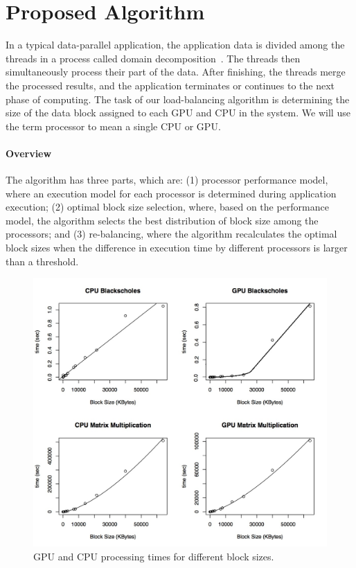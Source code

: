 \documentclass[journal]{IEEEtran}
\begin{document}

\section{Proposed Algorithm}

In a typical data-parallel application, the application data
is divided among the threads in a process called domain
decomposition~\cite{Gropp:1992uq}. The threads then simultaneously process their
part of the data. After finishing, the threads merge the processed results, and
the application terminates or continues to the next phase of computing. The task
of our load-balancing algorithm is determining the size of the data block
assigned to each GPU and CPU in the system. We will use the term processor to
mean a single CPU or GPU.

\vspace{0.2cm}
\paragraph*{Overview} The algorithm has three parts, which are: (1) processor 
performance model, where an execution model for each processor is determined
during application execution; (2) optimal block size selection, where, based on
the performance model, the algorithm selects the best distribution of block size
among the processors; and (3) re-balancing, where the algorithm recalculates the
optimal block sizes when the difference in execution time by different
processors is larger than a threshold.

\begin{figure}[!t]
	\centering
			\includegraphics[scale=0.45]{CPUVersusGPULinear2.jpg} 				
	\caption{GPU and CPU processing times for different block sizes.}
	\label{fig: CPUVersusGPU1}
\end{figure}
\end{document}

